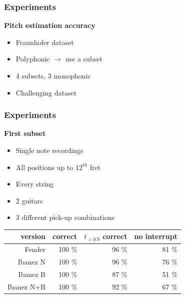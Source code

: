 \documentclass[table]{beamer}
\begin{document}
\begin{frame}
\frametitle{Experiments}
    {\large \textbf{Pitch estimation accuracy}}
    \begin{itemize}
        \item Fraunhofer dataset
        \item Polyphonic $\rightarrow$ use a subset
        \item 4 subsets, 3 monophonic
        \item Challenging dataset
    \end{itemize}
\end{frame}


\begin{frame}
\frametitle{Experiments}
    {\large \textbf{First subset}}
    \begin{itemize}
        \item Single note recordings
        \item All positions up to $12^{\text{th}}$ fret
        \item Every string
        \item 2 guitars
        \item 3 different pick-up combinations
    \end{itemize}
    \bigskip

    \hspace{+8mm}\begin{tabular}{r|rrr}
        version     & correct & $t_{>0.9}$ correct & no interrupt \\
        \hline
        Fender      & 100 \%  & 96 \%   & 81 \% \\
        Ibanez N    & 100 \%  & 96 \%   & 76 \% \\
        Ibanez B    & 100 \%  & 87 \%   & 51 \% \\
        Ibanez N+B  & 100 \%  & 92 \%   & 67 \%

    \end{tabular}
\end{frame}
\end{document}
